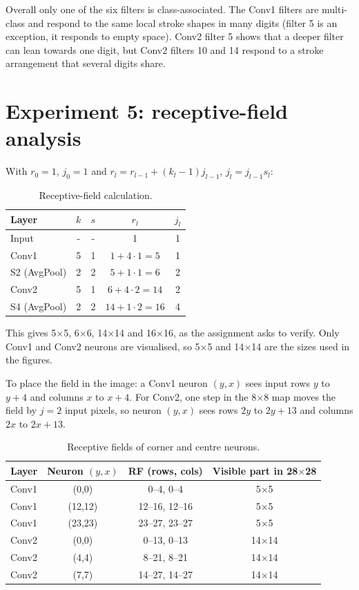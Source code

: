 \documentclass[12pt]{article}
\begin{document}
Overall only one of the six filters is class-associated. The Conv1 filters are multi-class and respond to the same local stroke shapes in many digits (filter 5 is an exception, it responds to empty space). Conv2 filter 5 shows that a deeper filter can lean towards one digit, but Conv2 filters 10 and 14 respond to a stroke arrangement that several digits share.


\section{Experiment 5: receptive-field analysis}

With $r_0=1$, $j_0=1$ and $r_l=r_{l-1}+(k_l-1)j_{l-1}$, $j_l=j_{l-1}s_l$:

\begin{table}[H]
\centering
\begin{tabular}{lcccc}
\toprule
Layer & $k$ & $s$ & $r_l$ & $j_l$ \\
\midrule
Input & - & - & 1 & 1 \\
Conv1 & 5 & 1 & $1+4\cdot1=5$ & 1 \\
S2 (AvgPool) & 2 & 2 & $5+1\cdot1=6$ & 2 \\
Conv2 & 5 & 1 & $6+4\cdot2=14$ & 2 \\
S4 (AvgPool) & 2 & 2 & $14+1\cdot2=16$ & 4 \\
\bottomrule
\end{tabular}
\caption{Receptive-field calculation.}
\end{table}

This gives 5$\times$5, 6$\times$6, 14$\times$14 and 16$\times$16, as the assignment asks to verify. Only Conv1 and Conv2 neurons are visualised, so 5$\times$5 and 14$\times$14 are the sizes used in the figures.

To place the field in the image: a Conv1 neuron $(y,x)$ sees input rows $y$ to $y+4$ and columns $x$ to $x+4$. For Conv2, one step in the 8$\times$8 map moves the field by $j=2$ input pixels, so neuron $(y,x)$ sees rows $2y$ to $2y+13$ and columns $2x$ to $2x+13$.

\begin{table}[H]
\centering
\begin{tabular}{lccc}
\toprule
Layer & Neuron $(y,x)$ & RF (rows, cols) & Visible part in 28$\times$28 \\
\midrule
Conv1 & (0,0)   & 0--4, 0--4     & 5$\times$5 \\
Conv1 & (12,12) & 12--16, 12--16 & 5$\times$5 \\
Conv1 & (23,23) & 23--27, 23--27 & 5$\times$5 \\
Conv2 & (0,0)   & 0--13, 0--13   & 14$\times$14 \\
Conv2 & (4,4)   & 8--21, 8--21   & 14$\times$14 \\
Conv2 & (7,7)   & 14--27, 14--27 & 14$\times$14 \\
\bottomrule
\end{tabular}
\caption{Receptive fields of corner and centre neurons.}
\end{table}
\end{document}
